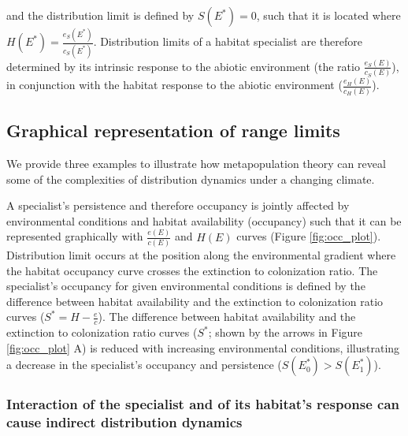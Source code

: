 \documentclass[12pt]{article}
\begin{document}
and the distribution limit is defined by \(S(E^{*}) = 0\), such that it
is located where \(H(E^{*}) = \frac{e_{S}(E^{*})}{c_{S}(E^{*})}\).
Distribution limits of a habitat specialist are therefore determined by
its intrinsic response to the abiotic environment (the ratio
\(\frac{e_{S}(E)}{c_{S}(E)}\)), in conjunction with the habitat response
to the abiotic environment (\(\frac{e_{H}(E)}{c_{H}(E)}\)).

\hypertarget{graphical-representation-of-range-limits}{%
\subsection{Graphical representation of range
limits}\label{graphical-representation-of-range-limits}}

We provide three examples to illustrate how metapopulation theory can
reveal some of the complexities of distribution dynamics under a
changing climate.

A specialist's persistence and therefore occupancy is jointly affected
by environmental conditions and habitat availability (occupancy) such
that it can be represented graphically with \(\frac{e(E)}{c(E)}\) and
\(H(E)\) curves (Figure \ref{fig:occ_plot}). Distribution limit occurs
at the position along the environmental gradient where the habitat
occupancy curve crosses the extinction to colonization ratio. The
specialist's occupancy for given environmental conditions is defined by
the difference between habitat availability and the extinction to
colonization ratio curves (\(S^{*} = H-\frac{e}{c}\)). The difference
between habitat availability and the extinction to colonization ratio
curves (\(S^{*}\); shown by the arrows in Figure \ref{fig:occ_plot} A)
is reduced with increasing environmental conditions, illustrating a
decrease in the specialist's occupancy and persistence
(\(S(E_{0}^{*}) > S(E_{1}^{*})\)).

\hypertarget{interaction-of-the-specialist-and-of-its-habitats-response-can-cause-indirect-distribution-dynamics}{%
\subsubsection{Interaction of the specialist and of its habitat's
response can cause indirect distribution
dynamics}\label{interaction-of-the-specialist-and-of-its-habitats-response-can-cause-indirect-distribution-dynamics}}
\end{document}
